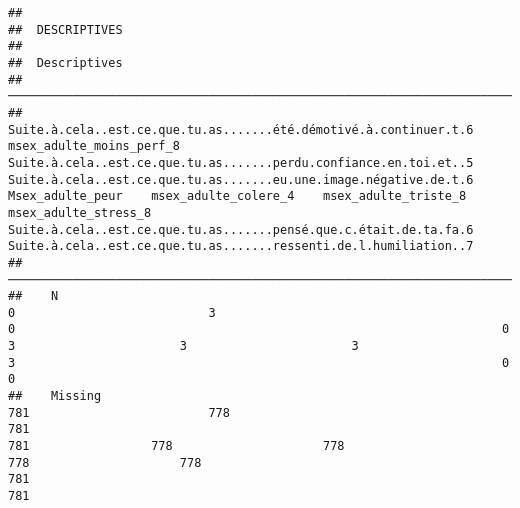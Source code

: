\documentclass[
]{article}
\begin{document}
\begin{verbatim}
## 
##  DESCRIPTIVES
## 
##  Descriptives                                                                                                                                                                                                                                                                                                                                                                                                                                                                                 
##  ──────────────────────────────────────────────────────────────────────────────────────────────────────────────────────────────────────────────────────────────────────────────────────────────────────────────────────────────────────────────────────────────────────────────────────────────────────────────────────────────────────────────────────────────────────────────────────────────────────────────────────────────────────────────────────────────────────────────────────────── 
##               Suite.à.cela..est.ce.que.tu.as.......été.démotivé.à.continuer.t.6    msex_adulte_moins_perf_8    Suite.à.cela..est.ce.que.tu.as.......perdu.confiance.en.toi.et..5    Suite.à.cela..est.ce.que.tu.as.......eu.une.image.négative.de.t.6    Msex_adulte_peur    msex_adulte_colere_4    msex_adulte_triste_8    msex_adulte_stress_8    Suite.à.cela..est.ce.que.tu.as.......pensé.que.c.était.de.ta.fa.6    Suite.à.cela..est.ce.que.tu.as.......ressenti.de.l.humiliation..7   
##  ──────────────────────────────────────────────────────────────────────────────────────────────────────────────────────────────────────────────────────────────────────────────────────────────────────────────────────────────────────────────────────────────────────────────────────────────────────────────────────────────────────────────────────────────────────────────────────────────────────────────────────────────────────────────────────────────────────────────────────────── 
##    N                                                                          0                           3                                                                    0                                                                    0                   3                       3                       3                       3                                                                    0                                                                    0   
##    Missing                                                                  781                         778                                                                  781                                                                  781                 778                     778                     778                     778                                                                  781                                                                  781   

\end{verbatim}
\end{document}
